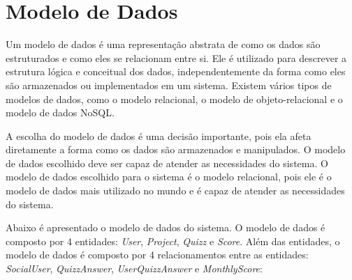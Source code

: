 \section{Modelo de Dados}

Um modelo de dados é uma representação abstrata de como os dados são estruturados e como eles se relacionam entre si. Ele é utilizado para descrever a estrutura lógica e conceitual dos dados, independentemente da forma como eles são armazenados ou implementados em um sistema. Existem vários tipos de modelos de dados, como o modelo relacional, o modelo de objeto-relacional e o modelo de dados NoSQL.

A escolha do modelo de dados é uma decisão importante, pois ela afeta diretamente a forma como os dados são armazenados e manipulados. O modelo de dados escolhido deve ser capaz de atender as necessidades do sistema. O modelo de dados escolhido para o sistema é o modelo relacional, pois ele é o modelo de dados mais utilizado no mundo e é capaz de atender as necessidades do sistema.

Abaixo é apresentado o modelo de dados do sistema. O modelo de dados é composto por 4 entidades: \textit{User}, \textit{Project}, \textit{Quizz} e \textit{Score}. Além das entidades, o modelo de dados é composto por 4 relacionamentos entre as entidades: \textit{SocialUser}, \textit{QuizzAnswer}, \textit{UserQuizzAnswer} e \textit{MonthlyScore}:

